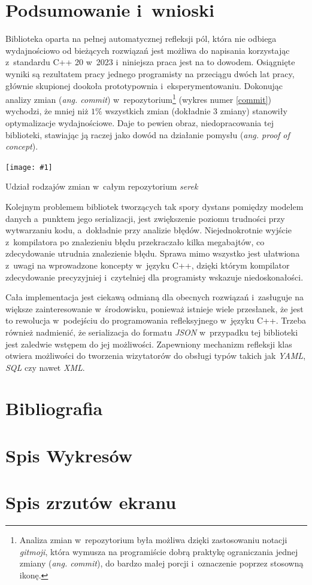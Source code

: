 \documentclass[12pt]{article}
\newcommand{\n}{\newline}
\newcommand{\putfig}[3]{
\begin{captioned}[H]
	\centering
	\texttt{[image: \#1]}
	\caption{#2}
	\label{#3}
	\medskip
\end{captioned}
}
\newcommand{\nonpl}[1]{{\it #1}}
\newcommand{\ang}[1]{\nonpl{ang. #1}}
\newcommand{\JSON}{\nonpl{JSON} }
\newcommand{\serek}{\nonpl{serek}}
\begin{document}
{		{
			\section{Podsumowanie i~wnioski}

			Biblioteka oparta na pełnej automatycznej refleksji pól, która nie odbiega wydajnościowo od bieżących rozwiązań jest możliwa do napisania korzystając
			z~standardu C++ 20 w~2023 i~niniejsza praca jest na to dowodem. Osiągnięte wyniki są rezultatem pracy jednego programisty na przeciągu dwóch lat
			pracy, głównie skupionej dookoła prototypownia i~eksperymentowaniu. Dokonując analizy zmian (\ang{commit}) w~repozytorium\footnote{
				Analiza zmian w~repozytorium była możliwa dzięki zastosowaniu notacji \nonpl{gitmoji}\cite{gitmoji}, która wymusza na programiście dobrą praktykę
				ograniczania jednej zmiany (\ang{commit}), do bardzo małej porcji i~oznaczenie poprzez stosowną ikonę.
			} (wykres numer \ref{commit}) wychodzi, że mniej niż $1\%$ wszystkich zmian (dokładnie $3$ zmiany) stanowiły optymalizacje wydajnościowe. Daje to pewien obraz,
			niedopracowania tej biblioteki, stawiając ją raczej jako dowód na działanie pomysłu (\ang{proof of concept}).\n

			\putfig{./charts/pre_generated_charts/commit_percentage.png}{Udział rodzajów zmian w~całym repozytorium \serek}{commit}

			\newpage

			Kolejnym problemem bibliotek tworzących tak spory dystans pomiędzy modelem danych a~punktem jego serializacji, jest zwiększenie poziomu trudności
			przy wytwarzaniu kodu, a~dokładnie przy analizie błędów. Niejednokrotnie wyjście z~kompilatora po znalezieniu błędu przekraczało kilka megabajtów,
			co zdecydowanie utrudnia znalezienie błędu. Sprawa mimo wszystko jest ułatwiona z~uwagi na wprowadzone koncepty w~języku C++, dzięki którym kompilator
			zdecydowanie precyzyjniej i~czytelniej dla programisty wskazuje niedoskonałości.\n

			Cała implementacja jest ciekawą odmianą dla obecnych rozwiązań i~zasługuje na większe zainteresowanie w~środowisku, ponieważ istnieje wiele przesłanek, że
			jest to rewolucja w~podejściu do programowania refleksyjnego w~języku C++. Trzeba również nadmienić, że serializacja do formatu \JSON w~przypadku tej biblioteki
			jest zaledwie wstępem do jej możliwości. Zapewniony mechanizm refleksji klas otwiera możliwości do tworzenia wizytatorów do obsługi typów takich jak \nonpl{YAML}, \nonpl{SQL}
			czy nawet \nonpl{XML}.
		}
	}

	{
		\section{Bibliografia}
		\printbibliography[heading=none]
	}

	{
		\section{Spis Wykresów}
		\listoffigures
		\thispagestyle{fancy}
	}

	{

		\section{Spis zrzutów ekranu}
		\listofscreenshots
		\thispagestyle{fancy}
	}
\end{document}
